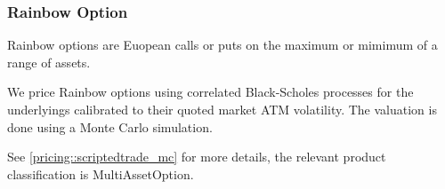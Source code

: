 \subsubsection{Rainbow Option}
\label{pricing::rainbowoption}

Rainbow options are Euopean calls or puts on the maximum or mimimum
of a range of assets. 

We price Rainbow options using correlated Black-Scholes processes for
the underlyings calibrated to their quoted market ATM
volatility. The valuation is done using a Monte Carlo simulation.

See \ref{pricing::scriptedtrade_mc} for more details, the relevant product classification is MultiAssetOption.

